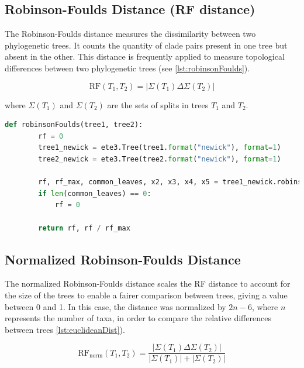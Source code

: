 \subsection{Robinson-Foulds Distance (RF distance)}\label{RF}
The Robinson-Foulds distance measures the dissimilarity between two phylogenetic trees. It counts the quantity of clade pairs present in one tree but absent in the other. This distance is frequently applied to measure topological differences between two phylogenetic trees (see \autoref{lst:robinsonFoulds}).

\begin{equation}
    \text{RF}(T_1, T_2) = | \Sigma(T_1) \Delta \Sigma(T_2) |
\end{equation}

where $\Sigma(T_1)$ and $\Sigma(T_2)$ are the sets of splits in trees $T_1$ and $T_2$.

\begin{lstlisting}[label=lst:robinsonFoulds,language=Python,caption=Python script for calculating the Robinson-Foulds distance using the ete3 package in the aPhyloGeo package]
    def robinsonFoulds(tree1, tree2):
        rf = 0
        tree1_newick = ete3.Tree(tree1.format("newick"), format=1)
        tree2_newick = ete3.Tree(tree2.format("newick"), format=1)

        rf, rf_max, common_leaves, x2, x3, x4, x5 = tree1_newick.robinson_foulds(tree2_newick, unrooted_trees=True)
        if len(common_leaves) == 0:
            rf = 0

        return rf, rf / rf_max
\end{lstlisting}


\subsection{Normalized Robinson-Foulds Distance}\label{RFnorm}
The normalized Robinson-Foulds distance scales the RF distance to account for the size of the trees to enable a fairer comparison between trees, giving a value between 0 and 1. In this case, the distance was normalized by $2n-6$, where $n$ represents the number of taxa, in order to compare the relative differences between trees \autoref{lst:euclideanDist}).

\begin{equation}
    \text{RF}_{\text{norm}}(T_1, T_2) = \frac{| \Sigma(T_1) \Delta \Sigma(T_2) |}{| \Sigma(T_1) | + | \Sigma(T_2) |}
\end{equation}

